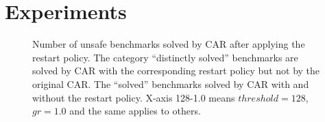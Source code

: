 \section{Experiments}
\begin{figure}[t]
\caption{Number of unsafe benchmarks solved by CAR after applying the restart policy. The category ``distinctly solved'' benchmarks are solved by CAR with the corresponding restart policy but not by the original CAR. The ``solved'' benchmarks solved by CAR with and without the restart policy. X-axis 128-1.0 means $threshold=128$, $gr=1.0$ and the same applies to others.}\label{fig:car}
\end{figure}
